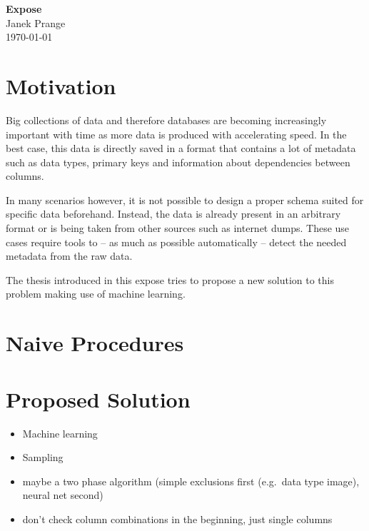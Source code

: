 \documentclass[a4paper]{article}
\begin{document}
\thispagestyle{firstpagestyle}
\begin{center}
  \huge \textbf{Expose}\\[8pt]
  \normalsize Janek Prange\\
  \today
\end{center}

\section{Motivation}
Big collections of data and therefore databases are becoming increasingly important with time as more data is produced with accelerating speed. In the best case, this data is directly saved in a format that contains a lot of metadata such as data types, primary keys and information about dependencies between columns.

In many scenarios however, it is not possible to design a proper schema suited for specific data beforehand. Instead, the data is already present in an arbitrary format or is being taken from other sources such as internet dumps. These use cases require tools to -- as much as possible automatically -- detect the needed metadata from the raw data. %

The thesis introduced in this expose tries to propose a new solution to this problem making use of machine learning.


\section{Naive Procedures}\label{sec:naiveProcedures}

\section{Proposed Solution}
\begin{itemize}
  \item Machine learning
  \item Sampling
  \item maybe a two phase algorithm (simple exclusions first (e.g.\ data type image), neural net second)
  \item don't check column combinations in the beginning, just single columns
\end{itemize}
\end{document}
